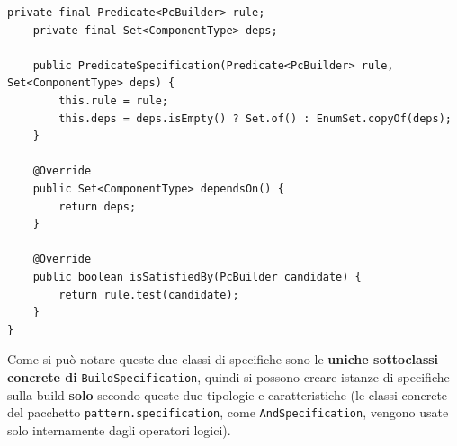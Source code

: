 \documentclass[12pt,a4paper]{article}
\begin{document}
\begin{enumerate}
\begin{lstlisting}[style=intellijlight, caption={A simple Java class}, label={lst:hello}]
    private final Predicate<PcBuilder> rule;
    private final Set<ComponentType> deps;

    public PredicateSpecification(Predicate<PcBuilder> rule, Set<ComponentType> deps) {
        this.rule = rule;
        this.deps = deps.isEmpty() ? Set.of() : EnumSet.copyOf(deps);
    }

    @Override
    public Set<ComponentType> dependsOn() {
        return deps;
    }

    @Override
    public boolean isSatisfiedBy(PcBuilder candidate) {
        return rule.test(candidate);
    }
}

    \end{lstlisting}
\end{enumerate}

Come si può notare queste due classi di specifiche sono le \textbf{uniche sottoclassi concrete di} \texttt{BuildSpecification}, quindi si possono creare istanze di specifiche sulla build \textbf{solo} secondo queste due tipologie e caratteristiche (le classi concrete del pacchetto \texttt{pattern.specification}, come \texttt{AndSpecification}, vengono usate solo internamente dagli operatori logici).
\end{document}
